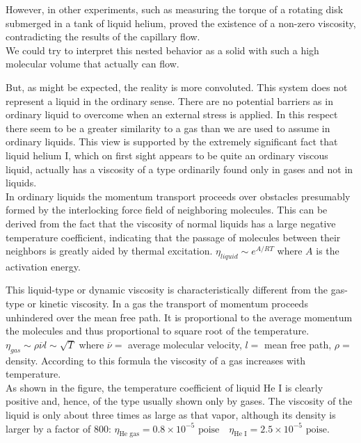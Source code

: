 \documentclass{article}
\begin{document}
However, in other experiments, such as measuring the torque of a rotating disk submerged in a tank of liquid helium, proved the existence of a non-zero viscosity, contradicting the results of the capillary flow.
\\

We could try to interpret this nested behavior as a solid with such a high molecular volume that actually can flow.

But, as might be expected, the reality is more convoluted. This system does not represent a liquid in the ordinary sense. There are no potential barriers as in ordinary liquid to overcome when an external stress is applied. In this respect there seem to be a greater similarity to a gas than we are used to assume in ordinary liquids. This view is supported by the extremely significant fact that liquid helium I, which on first sight appears to be quite an ordinary viscous liquid, actually has a viscosity of a type ordinarily found only in gases and not in liquids.
\\

In ordinary liquids the momentum transport proceeds over obstacles presumably formed by the interlocking force field of neighboring molecules. This can be derived from the fact that the viscosity of normal liquids has a large negative temperature coefficient, indicating that the passage of molecules between their neighbors is greatly aided by thermal excitation. $\eta_{liquid}\sim e^{A/RT}$ where $A$ is the activation energy.

This liquid-type or dynamic viscosity is characteristically different from the gas-type or kinetic viscosity. In a gas the transport of momentum proceeds unhindered over the mean free path. It is proportional to the average momentum the molecules and thus proportional to square root of the temperature. $\eta_{gas} \sim \rho \overline{\nu} l \sim \sqrt{T}$ where $\overline{\nu} =$ average molecular velocity, $l=$ mean free path, $\rho=$ density. According to this formula the viscosity of a gas increases with temperature.
\\

As shown in the figure, the temperature coefficient of liquid He I is clearly positive and, hence, of the type usually shown only by gases. The viscosity of the liquid is only about three times as large as that vapor, although its density is larger by a factor of 800: $\eta_{\text{He gas}} = 0.8\times 10^{-5} \text{ poise} \quad \eta_{\text{He I}} = 2.5\times 10^{-5} \text{ poise}$.
\\
\end{document}
